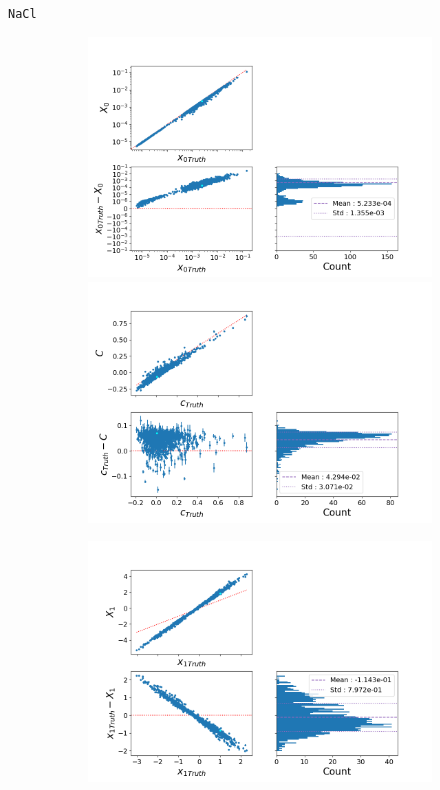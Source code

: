 \documentclass{beamer}
\begin{document}
\begin{frame}{\texttt{NaCl}}
\begin{figure}
	\begin{subfigure}{0.49\textwidth}
		\centering
		\includegraphics[width=.8\textwidth]{figures/nacl_x0.png}
		\includegraphics[width=.8\textwidth]{figures/nacl_c.png}
	\end{subfigure}
	\begin{subfigure}{0.49\textwidth}
		\centering
		\includegraphics[width=.8\textwidth]{figures/nacl_x1.png}

\end{subfigure}
\end{figure}
\end{frame}
\end{document}
